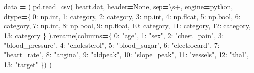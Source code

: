 \documentclass[
]{article}
\newenvironment{Shaded}{\begin{snugshade}}{\end{snugshade}}
\newcommand{\BuiltInTok}[1]{#1}
\newcommand{\DecValTok}[1]{\textcolor[rgb]{0.00,0.00,0.81}{#1}}
\newcommand{\NormalTok}[1]{#1}
\newcommand{\OperatorTok}[1]{\textcolor[rgb]{0.81,0.36,0.00}{\textbf{#1}}}
\newcommand{\StringTok}[1]{\textcolor[rgb]{0.31,0.60,0.02}{#1}}
\newcommand{\VariableTok}[1]{\textcolor[rgb]{0.00,0.00,0.00}{#1}}
\begin{document}
\begin{Shaded}
\begin{Highlighting}[]
\NormalTok{data }\OperatorTok{=}\NormalTok{ (}
\NormalTok{    pd.read\_csv(}
        \StringTok{\textquotesingle{}heart.dat\textquotesingle{}}\NormalTok{, header}\OperatorTok{=}\VariableTok{None}\NormalTok{, sep}\OperatorTok{=}\StringTok{\textquotesingle{}\textbackslash{}s+\textquotesingle{}}\NormalTok{, engine}\OperatorTok{=}\StringTok{\textquotesingle{}python\textquotesingle{}}\NormalTok{,}
\NormalTok{        dtype}\OperatorTok{=}\NormalTok{\{}
            \DecValTok{0}\NormalTok{: np.}\BuiltInTok{int}\NormalTok{, }\DecValTok{1}\NormalTok{: }\StringTok{\textquotesingle{}category\textquotesingle{}}\NormalTok{, }\DecValTok{2}\NormalTok{: }\StringTok{\textquotesingle{}category\textquotesingle{}}\NormalTok{,}
            \DecValTok{3}\NormalTok{: np.}\BuiltInTok{int}\NormalTok{, }\DecValTok{4}\NormalTok{: np.}\BuiltInTok{float}\NormalTok{, }\DecValTok{5}\NormalTok{: np.}\BuiltInTok{bool}\NormalTok{,}
            \DecValTok{6}\NormalTok{: }\StringTok{\textquotesingle{}category\textquotesingle{}}\NormalTok{, }\DecValTok{7}\NormalTok{: np.}\BuiltInTok{int}\NormalTok{, }\DecValTok{8}\NormalTok{: np.}\BuiltInTok{bool}\NormalTok{,}
            \DecValTok{9}\NormalTok{: np.}\BuiltInTok{float}\NormalTok{, }\DecValTok{10}\NormalTok{: }\StringTok{\textquotesingle{}category\textquotesingle{}}\NormalTok{, }\DecValTok{11}\NormalTok{: }\StringTok{\textquotesingle{}category\textquotesingle{}}\NormalTok{,}
            \DecValTok{12}\NormalTok{: }\StringTok{\textquotesingle{}category\textquotesingle{}}\NormalTok{, }\DecValTok{13}\NormalTok{: }\StringTok{\textquotesingle{}category\textquotesingle{}}
\NormalTok{        \}}
\NormalTok{    ).rename(columns}\OperatorTok{=}\NormalTok{\{}
        \DecValTok{0}\NormalTok{: }\StringTok{"age"}\NormalTok{, }\DecValTok{1}\NormalTok{: }\StringTok{"sex"}\NormalTok{, }\DecValTok{2}\NormalTok{: }\StringTok{"chest\_pain"}\NormalTok{,}
        \DecValTok{3}\NormalTok{: }\StringTok{"blood\_pressure"}\NormalTok{, }\DecValTok{4}\NormalTok{: }\StringTok{"cholesterol"}\NormalTok{,}
        \DecValTok{5}\NormalTok{: }\StringTok{"blood\_sugar"}\NormalTok{, }\DecValTok{6}\NormalTok{: }\StringTok{"electrocard"}\NormalTok{,}
        \DecValTok{7}\NormalTok{: }\StringTok{"heart\_rate"}\NormalTok{, }\DecValTok{8}\NormalTok{: }\StringTok{"angina"}\NormalTok{, }\DecValTok{9}\NormalTok{: }\StringTok{"oldpeak"}\NormalTok{,}
        \DecValTok{10}\NormalTok{: }\StringTok{"slope\_peak"}\NormalTok{, }\DecValTok{11}\NormalTok{: }\StringTok{"vessels"}\NormalTok{, }\DecValTok{12}\NormalTok{: }\StringTok{"thal"}\NormalTok{,}
        \DecValTok{13}\NormalTok{: }\StringTok{"target"}
\NormalTok{    \})}
\NormalTok{)}
\end{Highlighting}
\end{Shaded}
\end{document}
